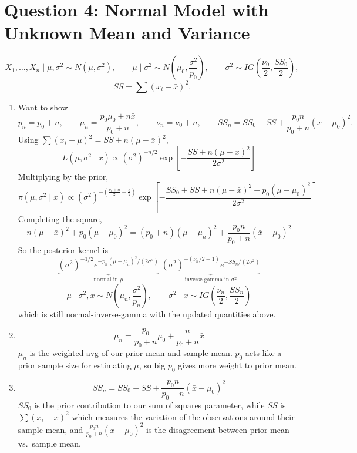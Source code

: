 \documentclass[11pt]{article}
\begin{document}
\section*{Question 4: Normal Model with Unknown Mean and Variance}

\[
X_1,\dots,X_n \mid \mu, \sigma^2 \sim N(\mu, \sigma^2), \qquad
\mu \mid \sigma^2 \sim N\left(\mu_0, \frac{\sigma^2}{p_0}\right), \qquad
\sigma^2 \sim IG\left(\frac{\nu_0}{2}, \frac{SS_0}{2}\right),
\]
\[
SS = \sum (x_i - \bar{x})^2.
\]

\begin{enumerate}
\item Want to show
\[
p_n = p_0 + n, \qquad \mu_n = \frac{p_0\mu_0 + n\bar{x}}{p_0 + n}, \qquad \nu_n = \nu_0 + n, \qquad
SS_n = SS_0 + SS + \frac{p_0 n}{p_0 + n}(\bar{x} - \mu_0)^2.
\]
Using $\sum (x_i - \mu)^2 = SS + n(\mu - \bar{x})^2$,
\[
L(\mu, \sigma^2 \mid x) \propto (\sigma^2)^{-n/2}\exp\left[-\frac{SS + n(\mu - \bar{x})^2}{2\sigma^2}\right]
\]
Multiplying by the prior,
\[
\pi(\mu, \sigma^2 \mid x) \propto (\sigma^2)^{-\left(\frac{\nu_0 + n}{2} + \frac{3}{2}\right)}
\exp\left[-\frac{SS_0 + SS + n(\mu - \bar{x})^2 + p_0(\mu - \mu_0)^2}{2\sigma^2}\right]
\]
Completing the square,
\[
n(\mu - \bar{x})^2 + p_0(\mu - \mu_0)^2 = (p_0 + n)(\mu - \mu_n)^2 + \frac{p_0 n}{p_0 + n}(\bar{x} - \mu_0)^2
\]
So the posterior kernel is
\[
\underbrace{(\sigma^2)^{-1/2}e^{-p_n(\mu - \mu_n)^2/(2\sigma^2)}}_{\text{normal in } \mu}\;
\underbrace{(\sigma^2)^{-(\nu_n/2 + 1)}e^{-SS_n/(2\sigma^2)}}_{\text{inverse gamma in } \sigma^2}
\]
\[
\boxed{\mu \mid \sigma^2, x \sim N\left(\mu_n, \frac{\sigma^2}{p_n}\right), \qquad
\sigma^2 \mid x \sim IG\left(\frac{\nu_n}{2}, \frac{SS_n}{2}\right)}
\]
which is still normal-inverse-gamma with the updated quantities above.

\item
\[
\mu_n = \frac{p_0}{p_0 + n}\mu_0 + \frac{n}{p_0 + n}\bar{x}
\]
$\mu_n$ is the weighted avg of our prior mean and sample mean. $p_0$ acts like a prior sample size for estimating $\mu$, so big $p_0$ gives more weight to prior mean.

\item
\[
SS_n = SS_0 + SS + \frac{p_0 n}{p_0 + n}(\bar{x} - \mu_0)^2
\]
$SS_0$ is the prior contribution to our sum of squares parameter, while $SS$ is $\sum (x_i - \bar{x})^2$ which measures the variation of the observations around their sample mean, and $\frac{p_0 n}{p_0 + n}(\bar{x} - \mu_0)^2$ is the disagreement between prior mean vs.\ sample mean.


\end{enumerate}
\end{document}
